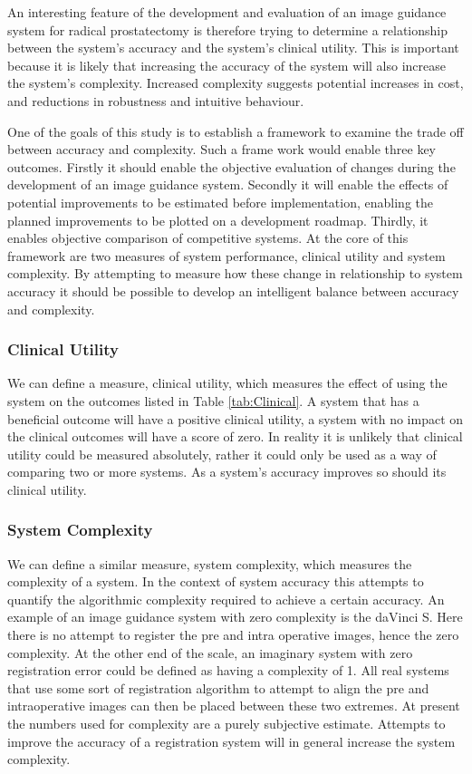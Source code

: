 \documentclass[3p,twocolumn,preprint,10pt]{elsarticle}
\begin{document}
An interesting feature of the development and evaluation of an image
guidance system for radical prostatectomy is therefore trying to determine
a relationship between the system's accuracy and the system's clinical utility.
This is important because it is likely that increasing the accuracy of the
system will also increase the system's complexity. Increased 
complexity suggests potential 
increases in cost, and reductions in robustness and intuitive behaviour.

One of the goals of this study is to establish a framework to examine the
trade off between accuracy and complexity. Such a frame work would enable 
three key outcomes. Firstly it should enable the objective evaluation of 
changes during the development of an image guidance system. Secondly 
it will enable the effects of potential improvements to be estimated before 
implementation, enabling the planned improvements to be plotted on a 
development roadmap. Thirdly, it 
enables objective comparison of competitive systems.
At the core of this framework are two measures of system performance, 
clinical utility and system complexity. By attempting to measure how these 
change in relationship to system accuracy it should be possible to develop 
an intelligent balance between accuracy and complexity. 
\subsubsection{Clinical Utility}
We can define a measure, clinical utility, which measures the effect of using 
the system on the outcomes
listed in Table \ref{tab:Clinical}. A system that has a beneficial outcome
will have a positive clinical utility, a system with no impact on the clinical outcomes
will have a score of zero. In reality it is unlikely that 
clinical utility could be measured absolutely, rather it could only be 
used as a way of comparing two or more systems. As a system's 
accuracy improves so should its clinical utility.

\subsubsection{System Complexity}
We can define a similar measure, system complexity, which measures the 
complexity of a system. In the context of system accuracy this attempts to 
quantify the algorithmic complexity required to achieve a certain accuracy. 
An example of an image guidance system with zero complexity is the 
daVinci S. Here there is no attempt to register the pre and intra operative images, hence
the zero complexity. At the other end of the scale, an imaginary system with 
zero registration error could be defined as having a complexity of 1. All real 
systems that use some sort of registration algorithm to attempt to align the pre and intraoperative 
images can then be placed between these two extremes. At present the numbers used
for complexity are a purely subjective estimate. Attempts to improve the 
accuracy of a registration system will in general increase the system complexity.
\end{document}

